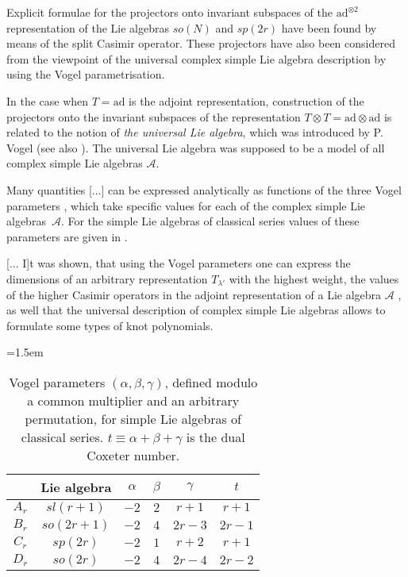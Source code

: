 \begin{description}
Explicit formulae for the projectors onto invariant subspaces of the
$\mathrm{ad}^{\otimes 2}$ representation of the Lie algebras $so(N)$ and $sp(2r)$
have been found by means of the split Casimir operator. These projectors
have also been considered from the viewpoint of the universal complex
simple Lie algebra description by using the Vogel parametrisation.

In the case when $T=\mathrm{ad}$ is the adjoint representation,
construction of the projectors onto the invariant subspaces of the
representation $T\otimes T=\mathrm{ad}\otimes \mathrm{ad}$ is related to
the notion of \textit{the universal Lie algebra}, which was introduced by
P. Vogel (see also ). The universal Lie
algebra was supposed to be a model of all complex simple Lie algebras
$\mathcal{A}$.

Many quantities [...] can be expressed analytically\cite{MkSeVe12} as
functions of the three Vogel parameters \cite{PV99,lands01}, which take
specific values for each of the complex simple Lie
algebras~$\mathcal{A}$. For the simple Lie algebras of classical series
values of these parameters are given in .

[... I]t was shown, that using the Vogel
parameters one can express the dimensions of an arbitrary representation
$T_{\lambda'}$ with the highest weight, the values of the
higher Casimir operators in the adjoint representation of a Lie algebra
$\mathcal{A}$ \cite{MkSeVe12}, as well that
the universal description of complex simple Lie algebras allows to
formulate some types of knot polynomials.

\begin{table}
\small
\centering
\caption{\label{IsaPro20:tab3}
Vogel parameters $(\alpha,\beta,\gamma)$, defined modulo a common
multiplier and an arbitrary permutation, for simple Lie algebras of
classical series. $t\equiv \alpha+\beta+\gamma$ is the
dual Coxeter number.}
\vspace*{1mm}\tabcolsep=1.5em
\renewcommand{\arraystretch}{1.2}
\begin{tabular}{|c|c|c|c|c|c|}
\hline
      & Lie algebra & $\alpha$ & $\beta$ & $\gamma$ & $t$\\
\hline
$A_r$ & $sl(r+1)$ & $-2$ & $2$ & $r+1$ & $r+1$\\
\hline
$B_r$ & $so(2r+1)$ & $-2$ & $4$ & $2r-3$ & $2r-1$\\
\hline
$C_r$ & $sp(2r)$ & $-2$ & $1$ & $r+2$ & $r+1$\\
\hline
$D_r$ & $so(2r)$ & $-2$ & $4$ & $2r-4$ & $2r-2$\\
\hline
\end{tabular}
\end{table}



\end{description}
